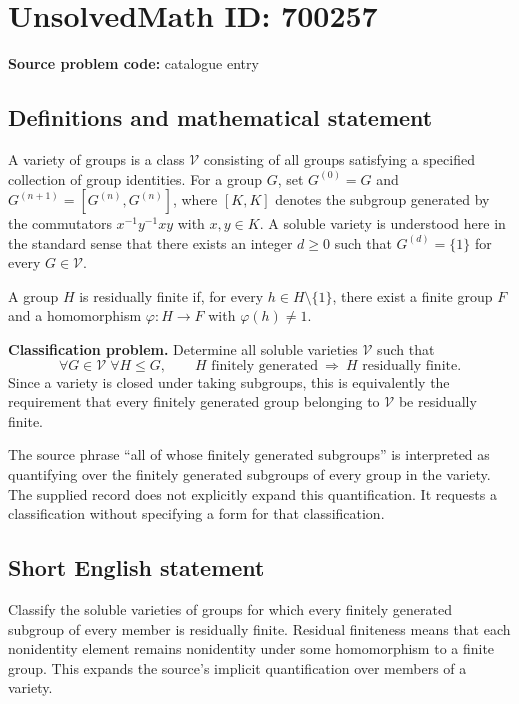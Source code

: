 \documentclass[11pt]{article}
\begin{document}
\section*{UnsolvedMath ID: 700257}
\textbf{Source problem code:} catalogue entry
\subsection{Definitions and mathematical statement}
A variety of groups is a class \(\mathcal V\) consisting of all groups satisfying a specified collection of group identities. For a group \(G\), set \(G^{(0)}=G\) and \(G^{(n+1)}=[G^{(n)},G^{(n)}]\), where \([K,K]\) denotes the subgroup generated by the commutators \(x^{-1}y^{-1}xy\) with \(x,y\in K\). A soluble variety is understood here in the standard sense that there exists an integer \(d\geq 0\) such that \(G^{(d)}=\{1\}\) for every \(G\in\mathcal V\).

A group \(H\) is residually finite if, for every \(h\in H\setminus\{1\}\), there exist a finite group \(F\) and a homomorphism \(\varphi:H\to F\) with \(\varphi(h)\neq 1\).

\textbf{Classification problem.} Determine all soluble varieties \(\mathcal V\) such that
\[
\forall G\in\mathcal V\;\forall H\leq G,\qquad
H\text{ finitely generated}\ \Longrightarrow\ H\text{ residually finite}.
\]
Since a variety is closed under taking subgroups, this is equivalently the requirement that every finitely generated group belonging to \(\mathcal V\) be residually finite.

The source phrase ``all of whose finitely generated subgroups'' is interpreted as quantifying over the finitely generated subgroups of every group in the variety. The supplied record does not explicitly expand this quantification. It requests a classification without specifying a form for that classification.
\subsection{Short English statement}
Classify the soluble varieties of groups for which every finitely generated subgroup of every member is residually finite. Residual finiteness means that each nonidentity element remains nonidentity under some homomorphism to a finite group. This expands the source's implicit quantification over members of a variety.
\end{document}
